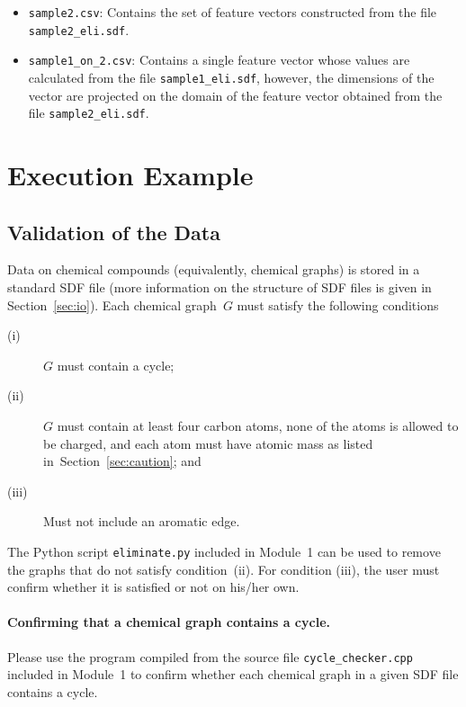 \documentclass[11pt, titlepage, dvipdfmx, twoside]{article}
\newcommand{\secref}[1]{Section~\ref{sec:#1}}
\begin{document}
\begin{itemize}
\begin{itemize}
  {\tt eliminate.py} when invoked on the file {\tt sample2.sdf}.
  The contents of the files {\tt sample2.sdf} and {\tt sample2\_eli.sdf}
  should be identical.
  \item {\tt sample2.csv}: 
  Contains the set of feature vectors
  constructed from the file
  {\tt sample2\_eli.sdf}.
  \item {\tt sample1\_on\_2.csv}: 
  Contains a single feature vector whose values are calculated
  from the file
  {\tt sample1\_eli.sdf},
  however, the dimensions of the vector are projected 
  on the domain of the feature vector obtained from
  the file {\tt sample2\_eli.sdf}. 
  \end{itemize}
\end{itemize}

\clearpage
\section{Execution Example}
\label{sec:quick}

\subsection{Validation of the Data}
%
Data on chemical compounds (equivalently, chemical graphs) is stored in a standard SDF file
(more information on the structure of SDF files is given in \secref{io}).
Each chemical graph~$G$ 
must satisfy the following conditions
%
\begin{description}
\item[(i)] 
 $G$ must contain a cycle;
%
\item[(ii)] 
 $G$ must contain at least four carbon atoms,
 none of the atoms is allowed to be charged,
 and each atom must have atomic mass as listed
 in~\secref{caution}; and
\item[(iii)] Must not include an aromatic edge.
\end{description}
%

The Python script {\tt eliminate.py}
included in Module~1 can be used to 
remove the graphs that do not satisfy 
condition~(ii).%
For condition (iii),
the user must confirm whether it is satisfied or not
on his/her own. 

\paragraph{Confirming that a chemical graph contains a cycle.}
%
Please use the program compiled from the source file  
{\tt cycle\_checker.cpp}
included in Module~1 to confirm whether each chemical graph in a given
SDF file contains a cycle.
\end{document}
